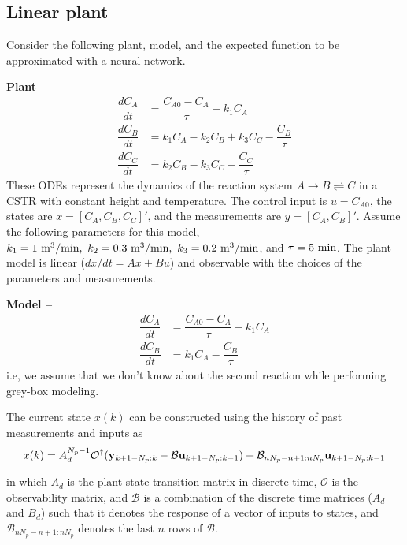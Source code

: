 \documentclass{article}
\begin{document}
\subsection{Linear plant}

Consider the following plant, model,
and the expected function to be approximated 
with a neural network.

\textbf{Plant --}
\begin{align*}
  \dfrac{dC_A}{dt} &= \dfrac{C_{A0} - C_A}{\tau} - k_1C_A\\
  \dfrac{dC_B}{dt} &= k_1C_A - k_2C_B + k_3C_C- \dfrac{C_B}{\tau}\\
  \dfrac{dC_C}{dt} &= k_2C_B - k_3C_C - \dfrac{C_C}{\tau}
\end{align*}
These ODEs represent the dynamics of the reaction system
$A \rightarrow B \rightleftharpoons C$ in a CSTR with constant 
height and temperature. The control input is $u = C_{A0}$,
the states are $x = [C_A, C_B, C_C]'$, 
and the measurements are $y = [C_A, C_B]'$. 
Assume the following 
parameters for this model, $k_1 = 1 \ \textnormal{m}^3/\textnormal{min}, 
\ k_2 = 0.3 \ \textnormal{m}^3/\textnormal{min},
\ k_3 = 0.2 \ \textnormal{m}^3/\textnormal{min}$, 
and $\tau = 5 \ \textnormal{min}$.
The plant model 
is linear ($dx/dt = Ax + Bu$) and 
observable with the choices of 
the parameters and measurements.

\textbf{Model --}
\begin{align*}
  \dfrac{dC_A}{dt} &= \dfrac{C_{A0} - C_A}{\tau} - k_1C_A\\
  \dfrac{dC_B}{dt} &= k_1C_A - \dfrac{C_B}{\tau}
\end{align*}
i.e, we assume that we don't know about the second reaction while 
performing grey-box modeling. 

The current state $x(k)$ can be constructed using the history of 
past measurements and inputs as 
\begin{equation*}
  x(k) = A^{N_p-1}_d
  \mathcal{O}^{\dagger}(\mathbf{y}_{k+1-N_p:k} - 
                        \mathcal{B}\mathbf{u}_{k+1-N_p:k-1}) + \\ 
      \mathcal{B}_{nN_p-n+1:nN_p}\mathbf{u}_{k+1-N_p:k-1}
\end{equation*}

in which $A_d$ is the plant state transition matrix in discrete-time, 
$\mathcal{O}$ is the observability matrix, 
and $\mathcal{B}$ is a combination of the 
discrete time matrices ($A_d$ and $B_d$) such that it 
denotes the response of a vector of inputs to states, 
and $\mathcal{B}_{nN_p-n+1:nN_p}$ denotes the last $n$
rows of $\mathcal{B}$.
\end{document}
